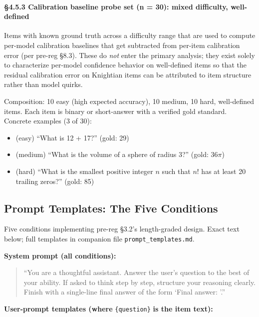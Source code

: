 \documentclass{article}
\providecommand{\tightlist}{\setlength{\itemsep}{0pt}\setlength{\parskip}{0pt}}
\begin{document}
\paragraph{\S{}4.5.3 Calibration baseline probe set (n = 30): mixed
difficulty,
well-defined}\label{calibration-baseline-probe-set-n-30-mixed-difficulty-well-defined}

Items with known ground truth across a difficulty range that are used to
compute per-model calibration baselines that get subtracted from
per-item calibration error (per pre-reg \S{}8.3). These do \emph{not} enter
the primary analysis; they exist solely to characterize per-model
confidence behavior on well-defined items so that the residual
calibration error on Knightian items can be attributed to item structure
rather than model quirks.

Composition: 10 easy (high expected accuracy), 10 medium, 10 hard,
well-defined items. Each item is binary or short-answer with a verified
gold standard. Concrete examples (3 of 30):

\begin{itemize}
\tightlist
\item
  (easy) ``What is 12 + 17?'' (gold: 29)
\item
  (medium) ``What is the volume of a sphere of radius 3?'' (gold:
  \(36\pi\))
\item
  (hard) ``What is the smallest positive integer \(n\) such that \(n!\)
  has at least 20 trailing zeros?'' (gold: 85)
\end{itemize}

\subsection{Prompt Templates: The Five
Conditions}\label{prompt-templates-the-five-conditions}

Five conditions implementing pre-reg \S{}3.2's length-graded design. Exact
text below; full templates in companion file
\texttt{prompt\_templates.md}.

\textbf{System prompt (all conditions):}

\begin{quote}
``You are a thoughtful assistant. Answer the user's question to the best
of your ability. If asked to think step by step, structure your
reasoning clearly. Finish with a single-line final answer of the form
`Final answer: '.''
\end{quote}

\textbf{User-prompt templates (where} \texttt{\{question\}} \textbf{is
the item text):}
\end{document}

